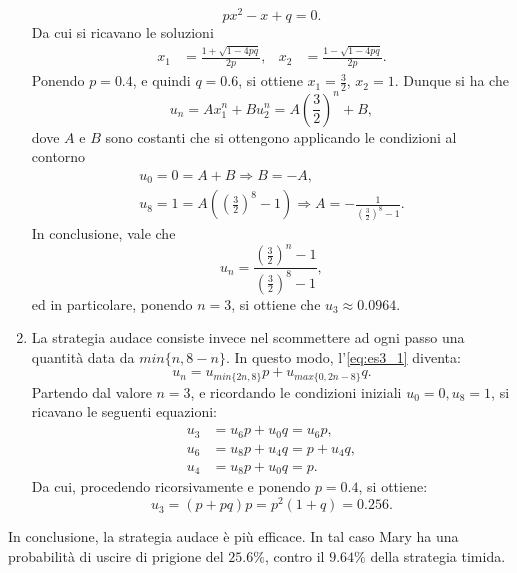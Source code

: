\documentclass[
	12pt, %
]{fphw}
\begin{document}
\begin{enumerate}
\begin{equation*}
			px^2 - x + q = 0.
		\end{equation*}
		Da cui si ricavano le soluzioni
		\begin{align*}
			x_1 &= \frac{1 + \sqrt{1 - 4pq}}{2p}, & x_2 &= \frac{1 - \sqrt{1 - 4pq}}{2p}.
		\end{align*}
		Ponendo $p = 0.4$, e quindi $q = 0.6$, si ottiene $x_1 = \frac{3}{2}$, $x_2 = 1$.
		Dunque si ha che
		\begin{equation*}
			u_n = Ax_1^n + Bu_2^n = A\left( \frac{3}{2} \right)^n + B,
		\end{equation*}
		dove $A$ e $B$ sono costanti che si ottengono applicando le condizioni al contorno
		\begin{equation*}
			\begin{gathered}
				u_0 = 0 = A + B \Rightarrow  B = -A, \\
				u_8 = 1 = A\left( \left( \frac{3}{2} \right)^8 - 1 \right) \Rightarrow A = - \frac{1}{\left( \frac{3}{2} \right)^8 - 1}.
			\end{gathered}
		\end{equation*}
		In conclusione, vale che
		\begin{equation*}
			u_n = \frac{\left( \frac{3}{2} \right)^n - 1}{\left( \frac{3}{2} \right)^8 - 1},
		\end{equation*}
		ed in particolare, ponendo $n = 3$, si ottiene che $u_3 \approx 0.0964$.
	
	\item La strategia audace consiste invece nel scommettere ad ogni passo una quantità data da $min\{n, 8-n\}$.
		In questo modo, l'\autoref{eq:es3_1} diventa:
		\begin{equation*}
			u_n = u_{min\{2n, 8\}}p + u_{max\{0, 2n-8\}}q.
		\end{equation*}
		Partendo dal valore $n = 3$, e ricordando le condizioni iniziali $u_0 = 0, u_8 = 1$, si ricavano le seguenti equazioni:
		\begin{equation*}
			\begin{aligned}
				u_3 &= u_6p + u_0q = u_6p,	\\
				u_6 &= u_8p + u_4q = p + u_4q,	\\
				u_4 &= u_8p + u_0q = p.				
			\end{aligned}
		\end{equation*}
		Da cui, procedendo ricorsivamente e ponendo $p = 0.4$, si ottiene:
		\begin{equation*}
			u_3 = (p + pq)p = p^2(1 + q) = 0.256.
		\end{equation*}
\end{enumerate}
In conclusione, la strategia audace è più efficace.
In tal caso Mary ha una probabilità di uscire di prigione del $25.6\%$, contro il $9.64\%$ della strategia timida.
\end{document}

